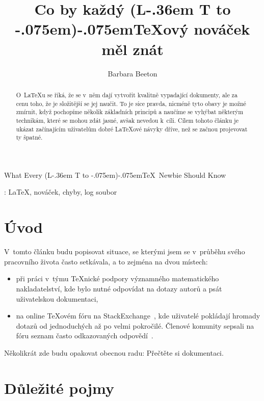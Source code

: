 \documentclass{csbulletin}
\makeatletter
\DeclareRobustCommand{\La}{L\kern-.36em%
        {\sbox\z@ T%
         \vbox to\ht\z@{\hbox{\check@mathfonts
                              \fontsize\sf@size\z@
                              \math@fontsfalse\selectfont
                              A}%
                        \vss}%
        }}
\def\AllTeX{(\La\kern-.075em)\kern-.075em\TeX}
\makeatother
\begin{document}
\title
  {Co by každý \AllTeX ový nováček měl znát}
\EnglishTitle
  {What Every \AllTeX\ Newbie Should Know}
\author{Barbara Beeton}

\maketitle[3pt]

\begin{abstract}
O~\LaTeX u se říká, že se v~něm dají vytvořit kvalitně vypadající dokumenty,
ale za cenu toho, že je složitější se jej naučit.
To je sice pravda, nicméně tyto obavy je možné zmírnit, když pochopíme několik základních principů a naučíme se vyhýbat některým technikám, které se mohou zdát jasné, avšak nevedou k~cíli. Cílem tohoto článku je ukázat začínajícím uživatelům dobré \LaTeX ové návyky dříve, než se začnou projevovat ty špatné.
\end{abstract}
\klicovaslova: \LaTeX, nováček, chyby, log soubor

\makeatletter
\def\@thefnmark{}
\makeatother

\section{Úvod}

V~tomto článku budu popisovat situace, se kterými jsem se v~průběhu svého pracovního života často setkávala, a to zejména na dvou místech:
\begin{itemize}
\item při práci v~týmu \TeX nické podpory významného matematického nakladatelství, kde bylo nutné odpovídat na dotazy autorů a psát uživatelskou dokumentaci,
\item na online \TeX ovém fóru na StackExchange~\cite{TSE}, kde uživatelé pokládají hromady dotazů od jednoduchých až po velmi pokročilé. Členové komunity sepsali na fóru seznam často odkazovaných odpovědí~\cite{2419}.
\end{itemize}
Několikrát zde budu opakovat obecnou radu: Přečtěte si dokumentaci.

\section{Důležité pojmy}
\label{dupo}
\end{document}
